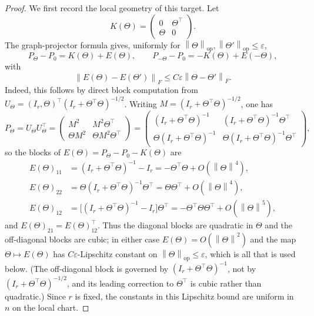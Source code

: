 \documentclass[11pt]{article}
\theoremstyle{tightplain}
\theoremstyle{tightdef}
\DeclareMathOperator{\op}{op}
\newcommand{\norm}[1]{\left\lVert #1 \right\rVert}
\begin{document}
\begin{proof}
We first record the local geometry of this target. Let
\[
K(\Theta)=
\begin{pmatrix}
0&\Theta^\top\\
\Theta&0
\end{pmatrix}.
\]
The graph-projector formula gives, uniformly for
$\norm{\Theta}_{\op},\norm{\Theta'}_{\op}\le\varepsilon$,
\[
P_\Theta-P_0=K(\Theta)+E(\Theta),
\qquad
P_{-\Theta}-P_0=-K(\Theta)+E(-\Theta),
\]
with
\[
\norm{E(\Theta)-E(\Theta')}_F
\le C\varepsilon\norm{\Theta-\Theta'}_F.
\]
Indeed, this follows by direct block computation from
$U_\Theta=(I_r,\Theta)^\top(I_r+\Theta^\top\Theta)^{-1/2}$. Writing
$M=(I_r+\Theta^\top\Theta)^{-1/2}$, one has
\[
P_\Theta
=U_\Theta U_\Theta^\top
=
\begin{pmatrix}
M^2 & M^2\Theta^\top\\[2pt]
\Theta M^2 & \Theta M^2\Theta^\top
\end{pmatrix}
=
\begin{pmatrix}
(I_r+\Theta^\top\Theta)^{-1} & (I_r+\Theta^\top\Theta)^{-1}\Theta^\top\\[2pt]
\Theta(I_r+\Theta^\top\Theta)^{-1} & \Theta(I_r+\Theta^\top\Theta)^{-1}\Theta^\top
\end{pmatrix},
\]
so the blocks of $E(\Theta)=P_\Theta-P_0-K(\Theta)$ are
\[
\begin{aligned}
E(\Theta)_{11}&=(I_r+\Theta^\top\Theta)^{-1}-I_r=-\Theta^\top\Theta+O(\norm{\Theta}^4),\\
E(\Theta)_{22}&=\Theta(I_r+\Theta^\top\Theta)^{-1}\Theta^\top=\Theta\Theta^\top+O(\norm{\Theta}^4),\\
E(\Theta)_{12}&=\bigl[(I_r+\Theta^\top\Theta)^{-1}-I_r\bigr]\Theta^\top
=-\Theta^\top\Theta\Theta^\top+O(\norm{\Theta}^5),
\end{aligned}
\]
and $E(\Theta)_{21}=E(\Theta)_{12}^\top$. Thus the diagonal blocks are quadratic
in $\Theta$ and the off-diagonal blocks are cubic; in either case
$E(\Theta)=O(\norm{\Theta}^2)$ and the map $\Theta\mapsto E(\Theta)$ has
$C\varepsilon$-Lipschitz constant on $\norm{\Theta}_{\op}\le\varepsilon$, which is
all that is used below. (The off-diagonal block is governed by
$(I_r+\Theta^\top\Theta)^{-1}$, not by $(I_r+\Theta^\top\Theta)^{-1/2}$, and its
leading correction to $\Theta^\top$ is cubic rather than quadratic.) Since $r$ is
fixed, the constants in this Lipschitz bound are uniform in $n$ on the local
chart.


\end{proof}
\end{document}
